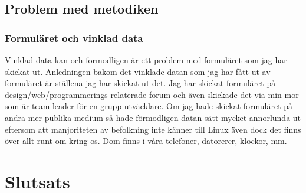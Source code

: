 \documentclass[12pt, a4paper]{report}
\begin{document}
\subsection{Problem med metodiken}

\subsubsection{Formuläret och vinklad data}

Vinklad data kan och formodligen är ett problem med formuläret som jag har skickat ut. Anledningen bakom det vinklade datan som jag har fått ut av formuläret är ställena jag har skickat ut det. Jag har skickat formuläret på design/web/programmerings relaterade forum och även skickade det via min mor som är team leader för en grupp utväcklare. Om jag hade skickat formuläret på andra mer publika medium så hade förmodligen datan sätt mycket annorlunda ut eftersom att manjoriteten av befolkning inte känner till Linux även dock det finns över allt runt om kring os. Dom finns i våra telefoner, datorerer, klockor, mm.


\section{Slutsats}\label{slutsatts}



\printbibliography
\end{document}
